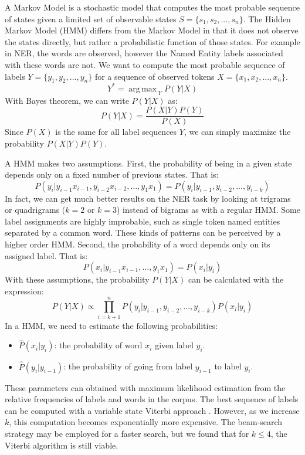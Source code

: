 \documentclass{nle}
\DeclareMathOperator*{\argmax}{arg\,max\,}
\begin{document}
A Markov Model is a stochastic model that computes the most probable sequence of states 
given a limited set of observable states $ S = \{s_1, s_2, ..., s_n \} $.
The Hidden Markov Model (HMM) differs from the Markov Model in that it
does not observe the states directly, but rather a probabilistic function of those 
states. For example in NER, the words are observed, however the Named Entity labels
associated with these words are not. We want to compute the most probable
sequence of labels $ Y = \{y_1, y_2, ..., y_n\} $ for a sequence of observed tokens
$ X = \{x_1, x_2, ..., x_n\} $.
%
\begin{equation}
Y^* = \argmax_{Y} P(Y|X)
\end{equation}
%
With Bayes theorem, we can write $ P(Y|X) $ as:
%
\begin{equation}
P(Y|X) = \frac{P(X|Y) P(Y)}{P(X)}
\end{equation}
%
Since $ P(X) $ is the same for all label sequences $ Y $, we can simply maximize
the probability $ P(X|Y) P(Y) $.

A HMM makes two assumptions. First, the probability of being in a given state depends 
only on a fixed number of previous states. That is:
%
\begin{equation}
P(y_i|y_{i-1}x_{i-1}, y_{i-2}x_{i-2}, ..., y_1x_1) = P(y_i|y_{i-1}, y_{i-2},..., y_{i-k})
\end{equation}
%
In fact, we can get much better results on the NER task by looking at trigrams
or quadrigrams ($ k = 2 $ or $ k = 3 $) instead of bigrams as with a regular HMM. 
Some label assignments are highly improbable, such as single token named entities 
separated by a common word. These kinds of patterns can be perceived by a higher order HMM.
Second, the probability of a word depends only on its assigned label. That is:
%
\begin{equation}
P(x_i|y_{i-1}x_{i-1}, ..., y_1x_1) = P(x_i|y_i)
\end{equation}
%
With these assumptions, 
the probability $ P(Y|X) $ can be calculated with the expression:
%
\begin{equation}
P(Y|X) \propto \prod_{i=k+1}^{n} P(y_i|y_{i-1}, y_{i-2}, ..., y_{i-k}) P(x_i|y_i)
\end{equation}
%
In a HMM, we need to estimate the following probabilities:
%
\begin{itemize}
  \item $ \hat{P}(x_i|y_i) $: the probability of word $ x_i $ given label $ y_i $.
  \item $ \hat{P}(y_i|y_{i-1}) $: the probability of going from label $ y_{i-1} $ to label $ y_i $.
\end{itemize}
%
These parameters can obtained with maximum likelihood estimation from the relative
frequencies of labels and words in the corpus. The best sequence of labels can be computed 
with a variable state Viterbi approach \cite{Li2000}. However, as we increase $ k $, this computation 
becomes exponentially more expensive. The beam-search strategy may be employed for a faster 
search, but we found that for $ k \leq 4 $, the Viterbi algorithm is still viable.
\end{document}
